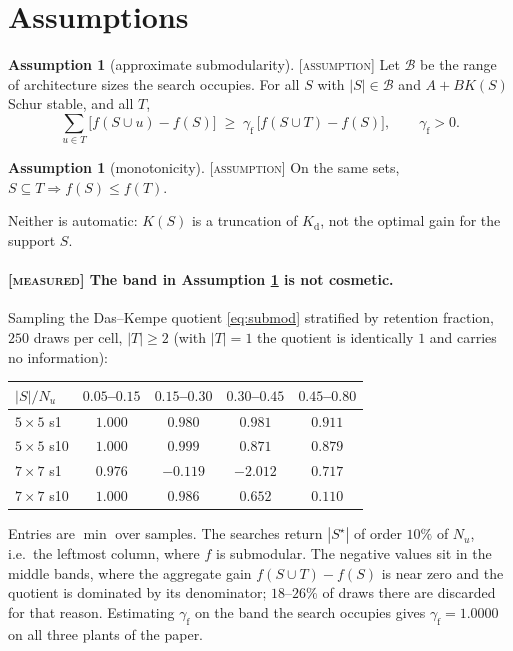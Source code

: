 \documentclass[11pt]{article}
\theoremstyle{definition}
\newtheorem{assumption}[theorem]{Assumption}
\theoremstyle{remark}
\newcommand{\Kd}{K_{\mathrm{d}}}
\newcommand{\gf}{\gamma_{\mathrm{f}}}
\newcommand{\Sstar}{S^{\star}}
\newcommand{\tagged}[1]{\textsc{[#1]}}
\begin{document}
\section{Assumptions}

\begin{assumption}[approximate submodularity]\label{as:submod} \tagged{assumption}
Let $\mathcal{B}$ be the range of architecture sizes the search occupies. For all
$S$ with $|S| \in \mathcal{B}$ and $A+BK(S)$ Schur stable, and all $T$,
\begin{equation}\label{eq:submod}
  \sum_{u \in T}\bigl[f(S \cup u) - f(S)\bigr]
  \;\geq\; \gf\,\bigl[f(S \cup T) - f(S)\bigr],
  \qquad \gf > 0 .
\end{equation}
\end{assumption}

\begin{assumption}[monotonicity]\label{as:mono} \tagged{assumption}
On the same sets, $S \subseteq T \Rightarrow f(S) \leq f(T)$.
\end{assumption}

Neither is automatic: $K(S)$ is a truncation of $\Kd$, not the optimal gain for
the support $S$.

\paragraph{\tagged{measured} The band in Assumption \ref{as:submod} is not cosmetic.}
Sampling the Das--Kempe quotient \eqref{eq:submod} stratified by retention
fraction, $250$ draws per cell, $|T| \geq 2$ (with $|T| = 1$ the quotient is
identically $1$ and carries no information):

\begin{center}
\begin{tabular}{lcccc}
\toprule
$|S|/N_u$ & $0.05$--$0.15$ & $0.15$--$0.30$ & $0.30$--$0.45$ & $0.45$--$0.80$ \\
\midrule
$5\times5$ s1  & $1.000$ & $0.980$  & $0.981$  & $0.911$ \\
$5\times5$ s10 & $1.000$ & $0.999$  & $0.871$  & $0.879$ \\
$7\times7$ s1  & $0.976$ & $-0.119$ & $-2.012$ & $0.717$ \\
$7\times7$ s10 & $1.000$ & $0.986$  & $0.652$  & $0.110$ \\
\bottomrule
\end{tabular}
\end{center}

Entries are $\min$ over samples. The searches return $|\Sstar|$ of order $10\%$ of
$N_u$, i.e.\ the leftmost column, where $f$ is submodular. The negative values sit
in the middle bands, where the aggregate gain $f(S \cup T) - f(S)$ is near zero and
the quotient is dominated by its denominator; $18$--$26\%$ of draws there are
discarded for that reason. Estimating $\gf$ on the band the search occupies gives
$\gf = 1.0000$ on all three plants of the paper.
\end{document}
